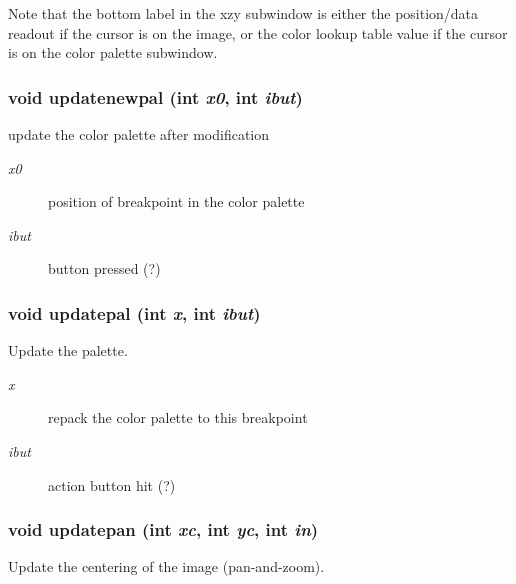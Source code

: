 Note that the bottom label in the xzy subwindow is either the position/data readout if the cursor is on the image, or the color lookup table value if the cursor is on the color palette subwindow. 
\subsubsection{\setlength{\rightskip}{0pt plus 5cm}void updatenewpal (int {\em x0}, int {\em ibut})}\label{xtvutils_8c_a202}


update the color palette after modification 

\begin{Desc}
\item[Parameters:]
\begin{description}
\item[{\em x0}]position of breakpoint in the color palette \item[{\em ibut}]button pressed (?) \end{description}
\end{Desc}
\subsubsection{\setlength{\rightskip}{0pt plus 5cm}void updatepal (int {\em x}, int {\em ibut})}\label{xtvutils_8c_a203}


Update the palette. 

\begin{Desc}
\item[Parameters:]
\begin{description}
\item[{\em x}]repack the color palette to this breakpoint \item[{\em ibut}]action button hit (?) \end{description}
\end{Desc}
\subsubsection{\setlength{\rightskip}{0pt plus 5cm}void updatepan (int {\em xc}, int {\em yc}, int {\em in})}\label{xtvutils_8c_a191}


Update the centering of the image (pan-and-zoom). 

